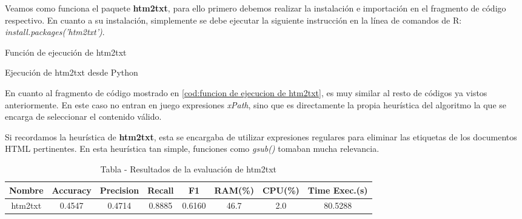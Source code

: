 Veamos como funciona el paquete \textbf{htm2txt}, para ello primero debemos realizar la instalación e
importación en el fragmento de código respectivo. En cuanto a su instalación, simplemente se debe ejecutar
la siguiente instrucción en la línea de comandos de R: \emph{install.packages('htm2txt')}.

\begin{codefloat}
    
    \caption{Función de ejecución de htm2txt}
    \label{cod:funcion de ejecucion de htm2txt}
\end{codefloat}

\begin{codefloat}
    
    \caption{Ejecución de htm2txt desde Python}
    \label{cod:ejecucion de htm2txt desde python}
\end{codefloat}

En cuanto al fragmento de código mostrado en \ref{cod:funcion de ejecucion de htm2txt}, es muy similar al
resto de códigos ya vistos anteriormente. En este caso no entran en juego expresiones \emph{xPath}, sino
que es directamente la propia heurística del algoritmo la que se encarga de seleccionar el contenido válido.

Si recordamos la heurística de \textbf{htm2txt}, esta se encargaba de utilizar expresiones regulares para
eliminar las etiquetas de los documentos HTML pertinentes. En esta heurística tan simple, funciones como 
\emph{gsub()} tomaban mucha relevancia.

\begin{table}[h]
    \begin{center}
      \begin{tabular}{| c | c | c | c | c | c | c | c |} \hline 
       \textbf{Nombre} & \textbf{Accuracy} & \textbf{Precision}  & \textbf{Recall} & \textbf{F1} & \textbf{RAM(\%)} & \textbf{CPU(\%)} & \textbf{Time Exec.(s)} \\ \hline
       htm2txt & 0.4547 & 0.4714 & 0.8885 & 0.6160 & 46.7 & 2.0 & 80.5288 \\ \hline
      \end{tabular}
      \caption{Tabla - Resultados de la evaluación de htm2txt}
      \label{tab:tabla - resultados de la evaluacion de htm2txt}
    \end{center}
\end{table}

